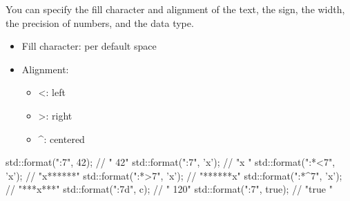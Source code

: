 You can specify the fill character and alignment of the text, the sign, the width, the precision of numbers, and the data type.


\begin{itemize}
\item 
Fill character: per default space
 
\item 
Alignment:

\begin{itemize}
\item 
<: left

\item 
>: right

\item 
\^{}: centered
\end{itemize}

\end{itemize}

\begin{cpp}
std::format("{:7}", 42);    // "     42"
std::format("{:7}", 'x');   // "x      "
std::format("{:*<7}", 'x'); // "x******"
std::format("{:*>7}", 'x'); // "******x"
std::format("{:*^7}", 'x'); // "***x***"
std::format("{:7d}", c);    // "    120"
std::format("{:7}", true);  // "true   "
\end{cpp}


